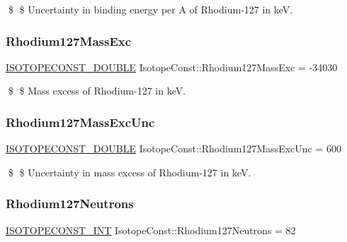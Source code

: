 \$ \$ Uncertainty in binding energy per A of Rhodium-\/127 in keV. \mbox{\label{group___isotope_const-_rhodium-_rh127_gaf0fe830e146e3cf31eeb83f694d04342}} 
\subsubsection{\texorpdfstring{Rhodium127\+Mass\+Exc}{Rhodium127MassExc}}
{\footnotesize\ttfamily \mbox{\hyperlink{group___isotope_const-_macros_ga8f45a7272ce02c0b4c65c44636ed719a}{I\+S\+O\+T\+O\+P\+E\+C\+O\+N\+S\+T\+\_\+\+D\+O\+U\+B\+LE}} Isotope\+Const\+::\+Rhodium127\+Mass\+Exc = -\/34030}

\$ \$ Mass excess of Rhodium-\/127 in keV. \mbox{\label{group___isotope_const-_rhodium-_rh127_gaeac326e81365345c725560a26212801b}} 
\subsubsection{\texorpdfstring{Rhodium127\+Mass\+Exc\+Unc}{Rhodium127MassExcUnc}}
{\footnotesize\ttfamily \mbox{\hyperlink{group___isotope_const-_macros_ga8f45a7272ce02c0b4c65c44636ed719a}{I\+S\+O\+T\+O\+P\+E\+C\+O\+N\+S\+T\+\_\+\+D\+O\+U\+B\+LE}} Isotope\+Const\+::\+Rhodium127\+Mass\+Exc\+Unc = 600}

\$ \$ Uncertainty in mass excess of Rhodium-\/127 in keV. \mbox{\label{group___isotope_const-_rhodium-_rh127_ga86aad139a94837f24d85c398ad8f9eab}} 
\subsubsection{\texorpdfstring{Rhodium127\+Neutrons}{Rhodium127Neutrons}}
{\footnotesize\ttfamily \mbox{\hyperlink{group___isotope_const-_macros_ga5f18360b3e99483a35c32d789e62621c}{I\+S\+O\+T\+O\+P\+E\+C\+O\+N\+S\+T\+\_\+\+I\+NT}} Isotope\+Const\+::\+Rhodium127\+Neutrons = 82}

